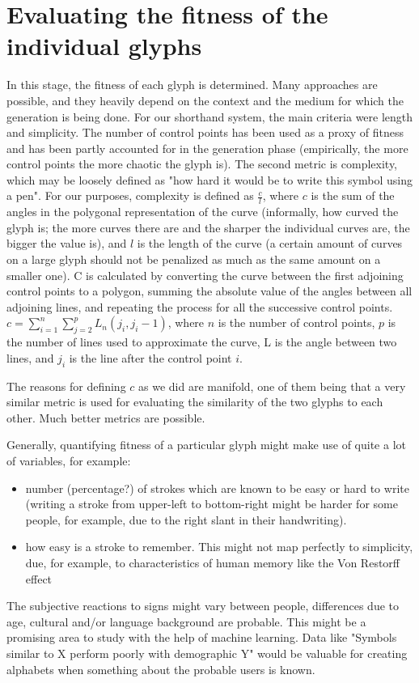 \documentclass[conference]{IEEEtran}
\begin{document}
\balance

\section{Evaluating the fitness of the individual glyphs}
In this stage, the fitness of each glyph is determined. Many approaches are possible, and they heavily depend on the context and the medium for which the generation is being done. For our shorthand system, the main criteria were length and simplicity. The number of control points has been used as a proxy of fitness and has been partly accounted for in the generation phase (empirically, the more control points the more chaotic the glyph is). The second metric is complexity, which may be loosely
defined as "how hard it would be to write this symbol using a pen". For our purposes, complexity is defined as \(\frac{c}{l}\), where \(c\) is the sum of the angles in the polygonal representation of the curve (informally, how curved the glyph is; the more curves there are and the sharper the individual curves are, the bigger the value is), and \(l\) is the length of the curve (a certain amount of curves on a large glyph should not be penalized as much as the same amount on a smaller one). C is calculated by converting the curve between the first adjoining control points to a polygon, summing the absolute value of the angles between all adjoining lines, and repeating the process for all the successive control points.
\(c=\sum_{i=1}^n\sum_{j=2}^{p}L_n(j_i, j_i-1)\), where \(n\) is the number of control points,  \(p\) is the number of lines used to approximate the curve, L is the angle between two lines,  and \(j_i\) is the line after the control point \(i\). 

The reasons for defining \(c\) as we did are manifold, one of them being that a very similar metric is used for evaluating the similarity of the two glyphs to each other. Much better metrics are possible.

Generally, quantifying fitness of a particular glyph might make use of quite a lot of variables, for example:
\begin{itemize}
        \item number (percentage?) of strokes which are known to be easy or hard to write (writing a stroke from upper-left to bottom-right might be harder for some people, for example, due to the right slant in their handwriting). 
        \item how easy is a stroke to remember. This might not map perfectly to simplicity, due, for example, to characteristics of human memory like the Von Restorff effect~\cite{hunt1995subtlety}
\end{itemize}
	The subjective reactions to signs might vary between people, differences due to age, cultural and/or language background are probable. This might be a promising area to study with the help of machine learning. Data like "Symbols similar to X perform poorly with demographic Y" would be valuable for creating alphabets when something about the probable users is known. 
\end{document}

